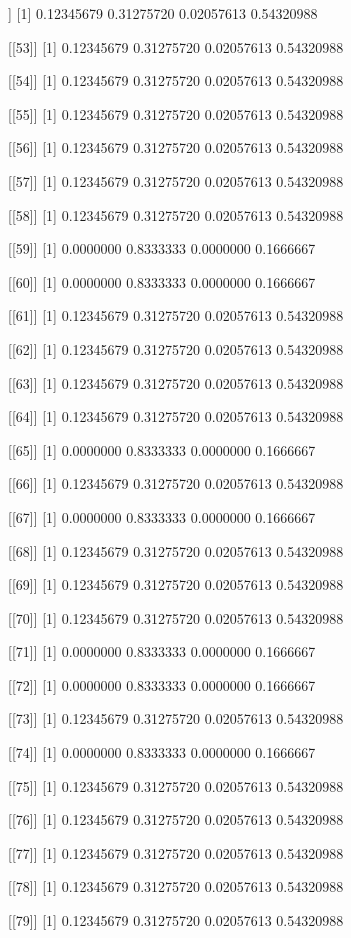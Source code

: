 \documentclass{article}
\begin{document}
\begin{Schunk}
\begin{Soutput}
[[52]]
[1] 0.12345679 0.31275720 0.02057613 0.54320988

[[53]]
[1] 0.12345679 0.31275720 0.02057613 0.54320988

[[54]]
[1] 0.12345679 0.31275720 0.02057613 0.54320988

[[55]]
[1] 0.12345679 0.31275720 0.02057613 0.54320988

[[56]]
[1] 0.12345679 0.31275720 0.02057613 0.54320988

[[57]]
[1] 0.12345679 0.31275720 0.02057613 0.54320988

[[58]]
[1] 0.12345679 0.31275720 0.02057613 0.54320988

[[59]]
[1] 0.0000000 0.8333333 0.0000000 0.1666667

[[60]]
[1] 0.0000000 0.8333333 0.0000000 0.1666667

[[61]]
[1] 0.12345679 0.31275720 0.02057613 0.54320988

[[62]]
[1] 0.12345679 0.31275720 0.02057613 0.54320988

[[63]]
[1] 0.12345679 0.31275720 0.02057613 0.54320988

[[64]]
[1] 0.12345679 0.31275720 0.02057613 0.54320988

[[65]]
[1] 0.0000000 0.8333333 0.0000000 0.1666667

[[66]]
[1] 0.12345679 0.31275720 0.02057613 0.54320988

[[67]]
[1] 0.0000000 0.8333333 0.0000000 0.1666667

[[68]]
[1] 0.12345679 0.31275720 0.02057613 0.54320988

[[69]]
[1] 0.12345679 0.31275720 0.02057613 0.54320988

[[70]]
[1] 0.12345679 0.31275720 0.02057613 0.54320988

[[71]]
[1] 0.0000000 0.8333333 0.0000000 0.1666667

[[72]]
[1] 0.0000000 0.8333333 0.0000000 0.1666667

[[73]]
[1] 0.12345679 0.31275720 0.02057613 0.54320988

[[74]]
[1] 0.0000000 0.8333333 0.0000000 0.1666667

[[75]]
[1] 0.12345679 0.31275720 0.02057613 0.54320988

[[76]]
[1] 0.12345679 0.31275720 0.02057613 0.54320988

[[77]]
[1] 0.12345679 0.31275720 0.02057613 0.54320988

[[78]]
[1] 0.12345679 0.31275720 0.02057613 0.54320988

[[79]]
[1] 0.12345679 0.31275720 0.02057613 0.54320988


\end{Soutput}
\end{Schunk}
\end{document}
